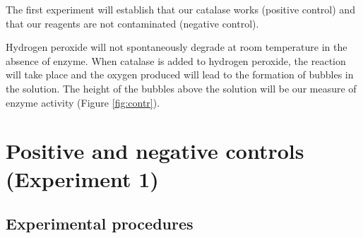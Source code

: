 The first experiment will establish that our catalase works (positive
control) and that our reagents are not contaminated (negative control).

Hydrogen peroxide will not spontaneously degrade at room temperature in
the absence of enzyme. When catalase is added to hydrogen peroxide, the
reaction will take place and the oxygen produced will lead to the
formation of bubbles in the solution. The height of the bubbles above
the solution will be our measure of enzyme activity (Figure
\ref{fig:contr}).

\section{Positive and negative controls (Experiment
1)}\label{positive-and-negative-controls-experiment-1}

\subsection{Experimental procedures}\label{experimental-procedures-20}

